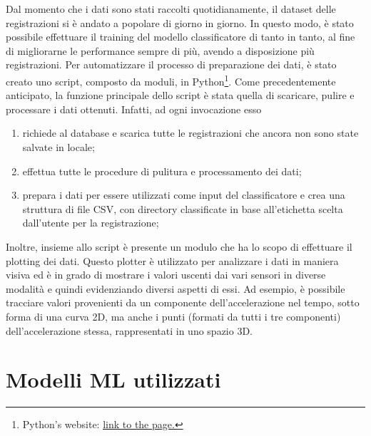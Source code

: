 Dal momento che i dati sono stati raccolti quotidianamente, il dataset delle registrazioni
si è andato a popolare di giorno in giorno. In questo modo, è stato possibile effettuare il 
training del modello classificatore di tanto in tanto, al fine di migliorarne le performance
sempre di più, avendo a disposizione più registrazioni. Per automatizzare il processo di 
preparazione dei dati, è stato creato uno script, composto da moduli, in Python\footnote{
Python's website: 
\href{https://www.python.org}{\underline{link to the page.}}}. Come
precedentemente anticipato, la funzione principale dello script è stata quella di scaricare,
pulire e processare i dati ottenuti. Infatti, ad ogni invocazione esso
\begin{enumerate}
    \item richiede al database e scarica tutte le registrazioni che ancora non sono state 
    salvate in locale;
    \item effettua tutte le procedure di pulitura e processamento dei dati;
    \item prepara i dati per essere utilizzati come input del classificatore e crea una 
    struttura di file CSV, con directory classificate in base all'etichetta scelta
    dall'utente per la registrazione;
\end{enumerate}
Inoltre, insieme allo script è presente un modulo che ha lo scopo di effettuare il plotting
dei dati. Questo plotter è utilizzato per analizzare i dati in maniera visiva ed è in
grado di mostrare i valori uscenti dai vari sensori in diverse modalità e quindi
evidenziando diversi aspetti di essi. Ad esempio, è possibile tracciare valori provenienti
da un componente dell'accelerazione nel tempo, sotto forma di una curva 2D, ma anche i 
punti (formati da tutti i tre componenti) dell'accelerazione stessa, rappresentati in uno 
spazio 3D.

\section{Modelli ML utilizzati} 

